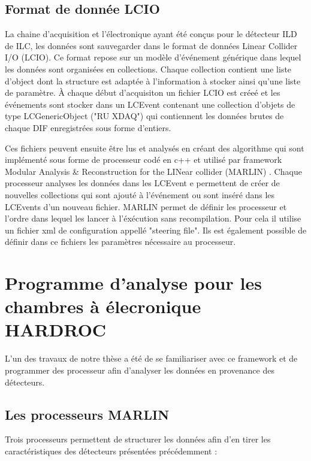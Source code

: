 \subsection{Format de donnée LCIO}
La chaine d'acquisition et l'électronique ayant été conçus pour le détecteur ILD de ILC, les données sont sauvegarder dans le format de données Linear Collider I/O (LCIO)\cite{2003physics6114G}. Ce format repose sur un modèle d'événement générique  dans lequel les données sont organisées en collections. Chaque collection contient une liste d'object dont la structure est adaptée à l'information à stocker ainsi qu'une liste de paramètre. À chaque début d'acquisiton un fichier LCIO est créeé et les événements sont stocker dans un LCEvent contenant une collection d'objets de type LCGenericObject ("RU XDAQ") qui contiennent les données brutes de chaque DIF enregistrées sous forme d'entiers.

Ces fichiers peuvent ensuite être lus et analysés en créant des algorithme qui sont implémenté sous forme de processeur codé en c++ et utilisé par framework Modular Analysis \& Reconstruction for the LINear collider (MARLIN) \cite{Gaede:2006pj}. Chaque processeur analyses les données dans les LCEvent e permettent de créer de nouvelles collections qui sont ajouté à l'événement ou sont inséré dans les LCEvents d'un nouveau fichier. MARLIN permet de définir les processeur et l'ordre dans lequel les lancer à l'éxécution sans recompilation. Pour cela il utilise un fichier xml de configuration appellé "steering file". Ils est également possible de définir dans ce fichiers les paramètres nécessaire au processeur.

\section{Programme d'analyse pour les chambres à élecronique HARDROC}
L'un des travaux de notre thèse a été de se familiariser avec ce framework et de programmer des processeur afin d'analyser les données en provenance des détecteurs. 

\subsection{Les processeurs MARLIN}
Trois processeurs permettent de structurer les données afin d'en tirer les caractéristiques des détecteurs présentées précédemment :

